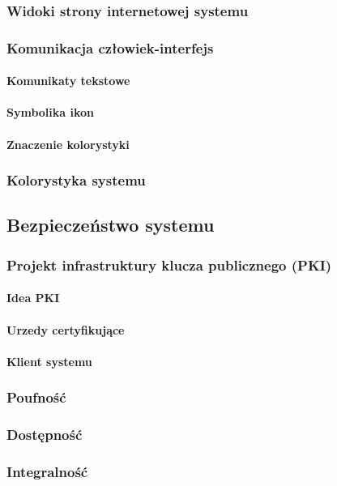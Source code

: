 	\subsubsection{Widoki strony internetowej systemu}
	
	\subsubsection{Komunikacja człowiek-interfejs}
	
		\paragraph{Komunikaty tekstowe}
		\paragraph{Symbolika ikon}
		\paragraph{Znaczenie kolorystyki}
		
	\subsubsection{Kolorystyka systemu}
	
\subsection{Bezpieczeństwo systemu}
	\subsubsection{Projekt infrastruktury klucza publicznego (PKI)}
		\paragraph{Idea PKI}
		\paragraph{Urzedy certyfikujące}
		\paragraph{Klient systemu}
	\subsubsection{Poufność}
	\subsubsection{Dostępność}
	\subsubsection{Integralność}